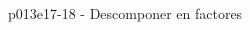 \documentclass[spanish, 11pt]{exam}
\begin{document}
\begin{questions}
\begin{multicols}{3}
\begin{parts}
        \end{parts}
        \end{multicols}
        \question p013e17-18 - Descomponer en factores
        \begin{multicols}{2} 
        \begin{parts} \part[1]  $ x^2-81 $  \begin{sol
\end{multicols}
\end{questions}
\end{document}
